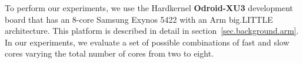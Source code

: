 To perform our experiments, we use the Hardkernel \textbf{Odroid-XU3} development board that has an 8-core Samsung Exynos 5422 with an Arm big.LITTLE architecture. 
This platform is described in detail in section~\ref{sec.background.arm}.
In our experiments, we evaluate a set of possible combinations of fast and slow cores varying the total number of cores from two to eight. 




